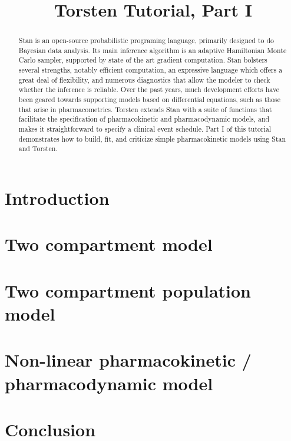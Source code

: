 \documentclass[11pt]{article}
\title{Torsten Tutorial, Part I}
\author{}
\date{}
\begin{document}
\maketitle

\begin{abstract}
  Stan is an open-source probabilistic programing language, primarily designed to do Bayesian data analysis.
  Its main inference algorithm is an adaptive Hamiltonian Monte Carlo sampler, supported by state of the art gradient computation.
  Stan bolsters several strengths, notably efficient computation, an expressive language which offers a great deal of flexibility, and numerous diagnostics that allow the modeler to check whether the inference is reliable.
  Over the past years, much development efforts have been geared towards supporting models based on differential equations, such as those that arise in pharmacometrics.
  Torsten extends Stan with a suite of functions that facilitate the specification of pharmacokinetic and pharmacodynamic models, and makes it straightforward to specify a clinical event schedule.
  Part I of this tutorial demonstrates how to build, fit, and criticize simple pharmacokinetic models using Stan and Torsten.
\end{abstract}

\section{Introduction}


%

\section{Two compartment model}


\section{Two compartment population model}


\section{Non-linear pharmacokinetic / pharmacodynamic model}


\section{Conclusion}




\end{document}
